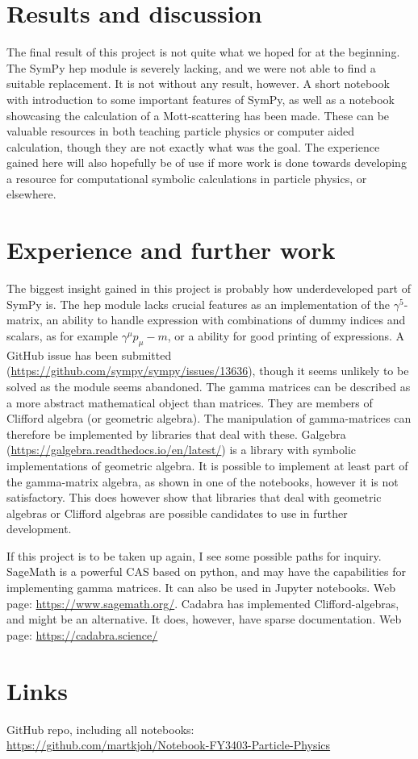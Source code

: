 \documentclass{article}
\begin{document}
    \section*{Results and discussion}
    The final result of this project is not quite what we hoped for at the beginning.
    The SymPy hep module is severely lacking, and we were not able to find a suitable replacement.
    It is not without any result, however.
    A short notebook with introduction to some important features of SymPy, as well as a notebook showcasing the calculation of a Mott-scattering has been made.
    These can be valuable resources in both teaching particle physics or computer aided calculation, though they are not exactly what was the goal.
    The experience gained here will also hopefully be of use if more work is done towards developing a resource for computational symbolic calculations in particle physics, or elsewhere.
    \section*{Experience and further work}
    The biggest insight gained in this project is probably how underdeveloped part of SymPy is.
    The hep module lacks crucial features as an implementation of the $\gamma^5$-matrix, an ability to handle expression with combinations of dummy indices and scalars, as for example $\gamma^\mu p_\mu - m$, or a ability for good printing of expressions.
    A GitHub issue has been submitted (\url{https://github.com/sympy/sympy/issues/13636}), though it seems unlikely to be solved as the module seems abandoned.
    The gamma matrices can be described as a more abstract mathematical object than matrices.
    They are members of Clifford algebra (or geometric algebra).
    The manipulation of gamma-matrices can therefore be implemented by libraries that deal with these.
    Galgebra (\url{https://galgebra.readthedocs.io/en/latest/}) is a library with symbolic implementations of geometric algebra.
    It is possible to implement at least part of the gamma-matrix algebra, as shown in one of the notebooks, however it is not satisfactory.
    This does however show that libraries that deal with geometric algebras or Clifford algebras are possible candidates to use in further development.
    

    If this project is to be taken up again, I see some possible paths for inquiry.
    SageMath is a powerful CAS based on python, and may have the capabilities for implementing gamma matrices.
    It can also be used in Jupyter notebooks.
    Web page: \url{https://www.sagemath.org/}.
    Cadabra has implemented Clifford-algebras, and might be an alternative.
    It does, however, have sparse documentation.
    Web page: \url{https://cadabra.science/ }

    \section*{Links}
    GitHub repo, including all notebooks:\\
    \url{https://github.com/martkjoh/Notebook-FY3403-Particle-Physics}

    \printbibliography
\end{document}
